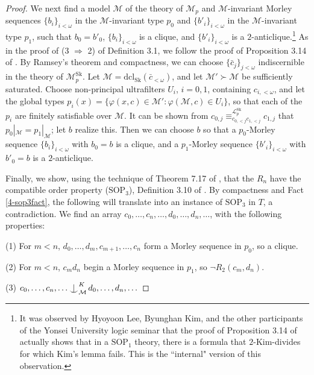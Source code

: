 \documentclass[12pt]{amsart}
\theoremstyle{definition}
\def\Ind#1#2{#1\setbox0=\hbox{$#1x$}\kern\wd0\hbox to 0pt{\hss$#1\mid$\hss}
\lower.9\ht0\hbox to 0pt{\hss$#1\smile$\hss}\kern\wd0}
\def\ind{\mathop{\mathpalette\Ind{}}}
\begin{document}
\begin{proof}
We next find a model $\mathcal{M}$ of the theory of $\mathcal{M}_{p}$ and $\mathcal{M}$-invariant Morley sequences $\{b_{i}\}_{i < \omega}$ in the $\mathcal{M}$-invariant type $p_{0}$ and $\{b'_{i}\}_{i < \omega}$ in the $\mathcal{M}$-invariant type $p_{1}$, such that $b_{0}= b'_{0}$, $\{b_{i}\}_{i < \omega}$ is a clique, and $\{b'_{i}\}_{i < \omega}$ is a $2$-anticlique.\footnote{It was observed by Hyoyoon Lee, Byunghan Kim, and the other participants of the Yonsei University logic seminar that the proof of Proposition 3.14 of \cite{KR17} actually shows that in a $\mathrm{SOP}_{1}$ theory, there is a formula that $2$-Kim-divides for which Kim's lemma fails. This is the ``internal" version of this observation.} As in the proof of (3 $\Rightarrow$ 2) of Definition 3.1, we follow the proof of Proposition 3.14 of \cite{KR17}. By Ramsey's theorem and compactness, we can choose $\{\bar{c}_{j}\}_{j < \omega}$ indiscernible in the theory of $\mathcal{M}_{p}^{\mathrm{Sk}}$. Let $\mathcal{M} = \mathrm{dcl}_{\mathrm{Sk}}(\bar{c}_{<\omega}) $, and let $\mathcal{M}'\succ \mathcal{M}$ be sufficiently saturated. Choose non-principal ultrafilters $U_{i}$, $i = 0, 1$, containing $c_{i,<\omega}$, and let the global types $p_{i}(x)=\{\varphi(x, c) \in \mathcal{M}': \varphi(\mathcal{M}, c) \in U_{i}\}$, so that each of the $p_{i}$ are finitely satisfiable over $\mathcal{M}$. It can be shown from $c_{0, j} \equiv^{\mathcal{L}_{p}^{\mathrm{Sk}}}_{c_{0, < j}c_{1, < j}} c_{1, j}$ that $p_{0}|_{\mathcal{M}} = p_{1}|_{\mathcal{M}}$; let $b$ realize this. Then we can choose $b$ so that a $p_{0}$-Morley sequence $\{b_{i}\}_{i < \omega}$ with $b_{0} = b$ is a clique, and a $p_{1}$-Morley sequence $\{b'_{i}\}_{i < \omega}$ with $b'_{0} = b$ is a $2$-anticlique.


Finally, we show, using the technique of Theorem 7.17 of \cite{Co15}, that the $R_{n}$ have the compatible order property ($\mathrm{SOP}_{3}$), Definition 3.10 of \cite{Mal10}. By compactness and Fact \ref{4-sop3fact}, the following will translate into an instance of $\mathrm{SOP}_{3}$ in $T$, a contradiction. We find an array $c_{0}, \ldots, c_{n}, \ldots, d_{0}, \ldots, d_{n}, \ldots$, with the following properties:

(1) For $m < n$, $d_{0}, \ldots, d_{m}, c_{m+1}, \ldots, c_{n}$ form a Morley sequence in $p_{0}$, so a clique.

(2) For $m < n$, $c_{m} d_{n} $ begin a Morley sequence in $p_{1}$, so $\neg R_{2}(c_{m}, d_{n})$. 

(3) $c_{0}, \ldots, c_{n}, \ldots\ind_{\mathcal{M}}^{K} d_{0}, \ldots, d_{n}, \ldots$



\end{proof}
\end{document}
